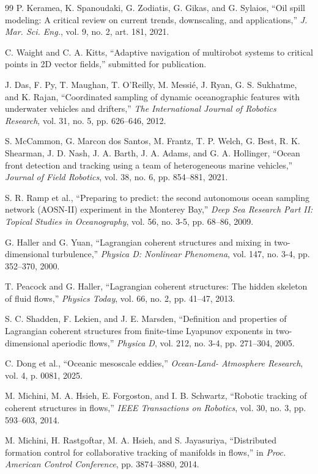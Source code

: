 \documentclass[lettersize,journal]{IEEEtran}
\begin{document}
\begin{thebibliography}{99}
 P. Keramea, K. Spanoudaki, G. Zodiatis, G. Gikas, and
G. Sylaios, ``Oil spill modeling: A critical review on current trends,
downscaling, and applications,'' \textit{J. Mar. Sci. Eng.}, vol. 9,
no. 2, art. 181, 2021.

 C. Waight and C. A. Kitts, ``Adaptive navigation of multirobot
systems to critical points in 2D vector fields,'' submitted for publication.

 J. Das, F. Py, T. Maughan, T. O'Reilly, M. Messié, J. Ryan,
G. S. Sukhatme, and K. Rajan, ``Coordinated sampling of dynamic oceanographic
features with underwater vehicles and drifters,'' \textit{The International
Journal of Robotics Research}, vol. 31, no. 5, pp. 626--646, 2012.

 S. McCammon, G. Marcon dos Santos, M. Frantz, T. P. Welch,
G. Best, R. K. Shearman, J. D. Nash, J. A. Barth, J. A. Adams, and
G. A. Hollinger, ``Ocean front detection and tracking using a
team of heterogeneous marine vehicles,'' \textit{Journal of Field Robotics},
vol. 38, no. 6, pp. 854--881, 2021.

 S. R. Ramp et al., ``Preparing to predict: the second autonomous
ocean sampling network (AOSN-II) experiment in the Monterey Bay,''
\textit{Deep Sea Research Part II: Topical Studies in Oceanography}, vol. 56,
no. 3-5, pp. 68--86, 2009.

 G. Haller and G. Yuan, ``Lagrangian coherent structures and mixing
in two-dimensional turbulence,'' \textit{Physica D: Nonlinear Phenomena},
vol. 147, no. 3-4, pp. 352--370, 2000.

 T. Peacock and G. Haller, ``Lagrangian coherent structures: The
hidden skeleton of fluid flows,'' \textit{Physics Today}, vol. 66, no. 2,
pp. 41--47, 2013.

 S. C. Shadden, F. Lekien, and J. E. Marsden, ``Definition and
properties of Lagrangian coherent structures from finite-time Lyapunov
exponents in two-dimensional aperiodic flows,'' \textit{Physica D}, vol. 212,
no. 3-4, pp. 271--304, 2005.

 C. Dong et al., ``Oceanic mesoscale eddies,'' \textit{Ocean-Land-
Atmosphere Research}, vol. 4, p. 0081, 2025.

 M. Michini, M. A. Hsieh, E. Forgoston, and I. B. Schwartz,
``Robotic tracking of coherent structures in flows,'' \textit{IEEE Transactions
on Robotics}, vol. 30, no. 3, pp. 593--603, 2014.

 M. Michini, H. Rastgoftar, M. A. Hsieh, and S. Jayasuriya,
``Distributed formation control for collaborative tracking of manifolds in
flows,'' in \textit{Proc. American Control Conference}, pp. 3874--3880, 2014.


\end{thebibliography}
\end{document}
